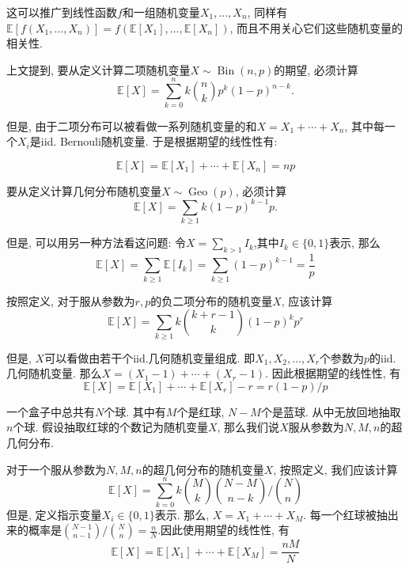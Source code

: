 \documentclass{ctexart}
\begin{document}
这可以推广到线性函数$f$和一组随机变量$X_1, ..., X_n$, 同样有$\mathbb{E}\left[f\left(X_1, \ldots, X_n\right)\right]=f\left(\mathbb{E}\left[X_1\right], \ldots, \mathbb{E}\left[X_n\right]\right)$, 而且不用关心它们这些随机变量的相关性.

\begin{example}[二项分布的期望]
上文提到, 要从定义计算二项随机变量$X \sim \operatorname{Bin}(n, p)$的期望, 必须计算$$\mathbb{E}[X]=\sum_{k=0}^n k\binom{n}{k} p^k(1-p)^{n-k}.$$ 

但是, 由于二项分布可以被看做一系列随机变量的和$X=X_1+\cdots+X_n$, 其中每一个$X_i$是iid. Bernouli随机变量. 于是根据期望的线性性有: 

$$\mathbb{E}[X]=\mathbb{E}\left[X_1\right]+\cdots+\mathbb{E}\left[X_n\right]=n p$$
    
\end{example}

\begin{example}[几何分布的期望]
    要从定义计算几何分布随机变量$X \sim \operatorname{Geo}(p)$, 必须计算
    $$\mathbb{E}[X]=\sum_{k \geq 1} k(1-p)^{k-1} p.$$ 

    但是, 可以用另一种方法看这问题: 令$X=\sum_{k>1} I_k$,其中$I_k\in \{ 0,1 \}$表示, 那么
$$
\mathbb{E}[X]=\sum_{k \geq 1} \mathbb{E}\left[I_k\right]=\sum_{k \geq 1}(1-p)^{k-1}=\frac{1}{p}
$$

\end{example}

\begin{example}[负二项分布的期望]
    按照定义, 对于服从参数为$r,p$的负二项分布的随机变量$X$, 应该计算
    $$
\mathbb{E}[X]=\sum_{k \geq 1} k\binom{k+r-1}{k}(1-p)^k p^r
$$

但是, $X$可以看做由若干个iid.几何随机变量组成. 即$X_1, X_2, ..., X_r$个参数为$p$的iid. 几何随机变量. 那么$X=\left(X_1-1\right)+\cdots+\left(X_r-1\right)$. 因此根据期望的线性性, 有
$$
\mathbb{E}[X]=\mathbb{E}\left[X_1\right]+\cdots+\mathbb{E}\left[X_r\right]-r=r(1-p) / p
$$
    
\end{example}

\begin{example}[超几何分布的期望]
    一个盒子中总共有$N$个球. 其中有$M$个是红球, $N-M$个是蓝球. 从中无放回地抽取$n$个球. 假设抽取红球的个数记为随机变量$X$, 那么我们说$X$服从参数为$N,M,n$的超几何分布. 

    对于一个服从参数为$N,M,n$的超几何分布的随机变量$X$, 按照定义, 我们应该计算
    $$
\mathbb{E}[X]=\sum_{k=0}^n k\binom{M}{k}\binom{N-M}{n-k} /\binom{N}{n}
$$
但是, 定义指示变量$X_i\in \{ 0, 1 \}$表示. 那么, $X=X_1+\cdots+X_M$. 每一个红球被抽出来的概率是$\binom{N-1}{n-1} /\binom{N}{n}=\frac{n}{N}$.因此使用期望的线性性, 有
$$
\mathbb{E}[X]=\mathbb{E}\left[X_1\right]+\cdots+\mathbb{E}\left[X_M\right]=\frac{n M}{N}
$$    
\end{example}
\end{document}

